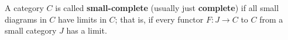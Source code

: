 A category $C$ is called \textbf{small-complete} (usually just \textbf{complete}) if all small diagrams in $C$ have limits in $C$; that is, if every functor $F: J \rightarrow C$ to $C$ from a small category $J$ has a limit.
